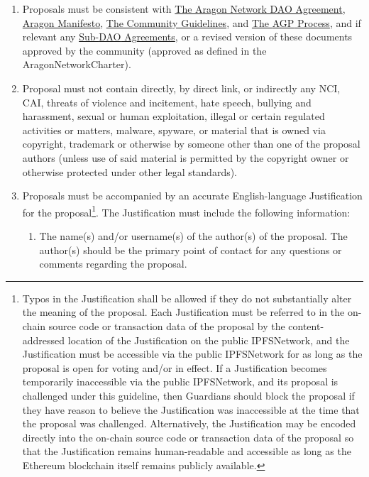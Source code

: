 \begin{enumerate}
\begin{enumerate}
		\begin{enumerate}
			\item Proposals must be consistent with  
			\hyperref[chap:ANDAOAgreement]{The Aragon Network DAO Agreement}, 
			\hyperref[chap:AragonManifesto]{Aragon Manifesto}, 
			\hyperref[chap:CommunityGuidelines]{The Community Guidelines}, and 
			\hyperref[chap:AGPProcess]{The \ac{AGP} Process}, and if relevant any 
			\hyperref[chap:SubDAOAgreements]{Sub-\ac{DAO} Agreements}, 
			or a revised version of these documents approved by the community (approved as defined in the \gls{AragonNetworkCharter}).
			\item Proposal must not contain directly, by direct link, or indirectly any \ac{NCI}, \ac{CAI}, threats of violence and incitement, hate speech, bullying and harassment, sexual or human exploitation, illegal or certain regulated activities or matters, malware, spyware, or material that is owned via copyright, trademark or otherwise by someone other than one of the proposal authors (unless use of said material is permitted by the copyright owner or otherwise protected under other legal standards).
			\item Proposals must be accompanied by an accurate English-language
			Justification for the proposal\footnote[1]{
				Typos in the Justification shall be allowed if they do not substantially alter the meaning of the proposal.
				Each Justification must be referred to in the on-chain source code or transaction data of the proposal by the content-addressed location of the Justification on the public \gls{IPFSNetwork}, and the Justification must be accessible via the public \gls{IPFSNetwork} for as long as the proposal is open for voting and/or in effect.
				If a Justification becomes temporarily inaccessible via the public \gls{IPFSNetwork}, and its proposal is challenged under this guideline, then \glspl{Guardian} should block the proposal if they have reason to believe the Justification was inaccessible at the time that the proposal was challenged.
				Alternatively, the Justification may be encoded directly into the on-chain source code or transaction data of the proposal so that the Justification remains human-readable and accessible as long as the Ethereum blockchain itself remains publicly available.
			}.
			The Justification must include the following information:
			\begin{enumerate}
				\item The name(s) and/or username(s) of the author(s) of the proposal.
				The author(s) should be the primary point of contact for any questions or comments regarding the proposal.

\end{enumerate}
\end{enumerate}
\end{enumerate}
\end{enumerate}
